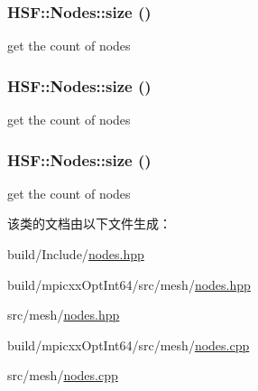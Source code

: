 \label{classHSF_1_1Nodes_ab8ee8ad861d256901605c11552e003d4}
\hypertarget{classHSF_1_1Nodes_a8e3420be01fedbc5682e037631c28465}{
\subsubsection[{size}]{ HSF::Nodes::size ()}}
\label{classHSF_1_1Nodes_a8e3420be01fedbc5682e037631c28465}


get the count of nodes \hypertarget{classHSF_1_1Nodes_a8e3420be01fedbc5682e037631c28465}{
\subsubsection[{size}]{ HSF::Nodes::size ()}}
\label{classHSF_1_1Nodes_a8e3420be01fedbc5682e037631c28465}


get the count of nodes \hypertarget{classHSF_1_1Nodes_a8e3420be01fedbc5682e037631c28465}{
\subsubsection[{size}]{ HSF::Nodes::size ()}}
\label{classHSF_1_1Nodes_a8e3420be01fedbc5682e037631c28465}


get the count of nodes 

该类的文档由以下文件生成：\begin{DoxyCompactItemize}
\item 
build/Include/\hyperlink{build_2Include_2nodes_8hpp}{nodes.hpp}\item 
build/mpicxxOptInt64/src/mesh/\hyperlink{build_2mpicxxOptInt64_2src_2mesh_2nodes_8hpp}{nodes.hpp}\item 
src/mesh/\hyperlink{src_2mesh_2nodes_8hpp}{nodes.hpp}\item 
build/mpicxxOptInt64/src/mesh/\hyperlink{build_2mpicxxOptInt64_2src_2mesh_2nodes_8cpp}{nodes.cpp}\item 
src/mesh/\hyperlink{src_2mesh_2nodes_8cpp}{nodes.cpp}\end{DoxyCompactItemize}
